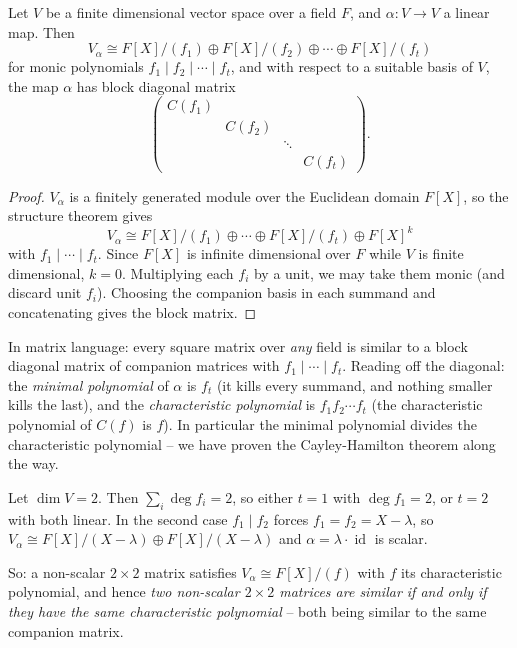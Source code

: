 \documentclass[a4paper]{scrartcl}
\begin{document}
\begin{theorem}
	Let $V$ be a finite dimensional vector space over a field $F$, and $\alpha: V \rightarrow V$ a linear map. Then
	$$
	V_{\alpha} \cong F[X]/(f_1) \oplus F[X]/(f_2) \oplus \cdots \oplus F[X]/(f_t)
	$$
	for monic polynomials $f_1 \mid f_2 \mid \cdots \mid f_t$, and with respect to a suitable basis of $V$, the map $\alpha$ has block diagonal matrix
	$$
	\begin{pmatrix}
		C(f_1) & & & \\
		& C(f_2) & & \\
		& & \ddots & \\
		& & & C(f_t)
	\end{pmatrix}.
	$$
\end{theorem}
\begin{proof}
	$V_{\alpha}$ is a finitely generated module over the Euclidean domain $F[X]$, so the structure theorem gives
	$$
	V_\alpha \cong F[X]/(f_1) \oplus \cdots \oplus F[X]/(f_t) \oplus F[X]^k
	$$
	with $f_1 \mid \cdots \mid f_t$. Since $F[X]$ is infinite dimensional over $F$ while $V$ is finite dimensional, $k = 0$. Multiplying each $f_i$ by a unit, we may take them monic (and discard unit $f_i$). Choosing the companion basis in each summand and concatenating gives the block matrix.
\end{proof}

\begin{remark}
	In matrix language: every square matrix over \emph{any} field is similar to a block diagonal matrix of companion matrices with $f_1 \mid \cdots \mid f_t$. Reading off the diagonal: the \emph{minimal polynomial} of $\alpha$ is $f_t$ (it kills every summand, and nothing smaller kills the last), and the \emph{characteristic polynomial} is $f_1 f_2 \cdots f_t$ (the characteristic polynomial of $C(f)$ is $f$). In particular the minimal polynomial divides the characteristic polynomial -- we have proven the Cayley-Hamilton theorem along the way.
\end{remark}

\begin{example}
	Let $\dim V = 2$. Then $\sum_i \deg f_i = 2$, so either $t = 1$ with $\deg f_1 = 2$, or $t = 2$ with both linear. In the second case $f_1 \mid f_2$ forces $f_1 = f_2 = X - \lambda$, so $V_{\alpha} \cong F[X]/(X - \lambda) \oplus F[X]/(X - \lambda)$ and $\alpha = \lambda \cdot \operatorname{id}$ is scalar.

	So: a non-scalar $2 \times 2$ matrix satisfies $V_\alpha \cong F[X]/(f)$ with $f$ its characteristic polynomial, and hence \emph{two non-scalar $2\times 2$ matrices are similar if and only if they have the same characteristic polynomial} -- both being similar to the same companion matrix.
\end{example}
\end{document}
